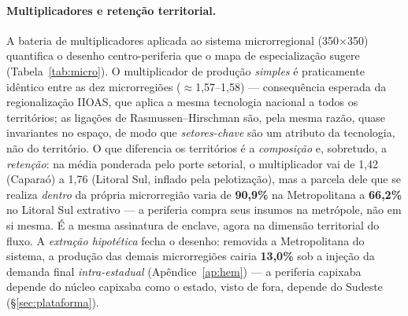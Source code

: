 \documentclass[11pt,a4paper]{article}
\begin{document}
\paragraph{Multiplicadores e retenção territorial.}
A bateria de multiplicadores aplicada ao sistema microrregional (350$\times$350)
quantifica o desenho centro-periferia que o mapa de especialização sugere
(Tabela~\ref{tab:micro}). O multiplicador de produção \emph{simples} é praticamente
idêntico entre as dez microrregiões ($\approx$1,57--1,58) --- consequência esperada da
regionalização IIOAS, que aplica a mesma tecnologia nacional a todos os territórios; as
ligações de Rasmussen--Hirschman são, pela mesma razão, quase invariantes no espaço, de
modo que \emph{setores-chave} são um atributo da tecnologia, não do território. O que
diferencia os territórios é a \emph{composição} e, sobretudo, a \emph{retenção}: na média
ponderada pelo porte setorial, o multiplicador vai de 1,42 (Caparaó) a 1,76 (Litoral Sul,
inflado pela pelotização), mas a parcela dele que se realiza \emph{dentro} da própria
microrregião varia de \textbf{90,9\%} na Metropolitana a \textbf{66,2\%} no Litoral Sul
extrativo --- a periferia compra seus insumos na metrópole, não em si mesma. É a mesma
assinatura de enclave, agora na dimensão territorial do fluxo. A \emph{extração hipotética}
\citep{dietzenbacher1993} fecha o desenho: removida a Metropolitana do sistema, a produção
das demais microrregiões cairia \textbf{13,0\%} sob a injeção da demanda final
\emph{intra-estadual} (Apêndice~\ref{ap:hem}) --- a periferia capixaba depende do núcleo
capixaba como o estado, visto de fora, depende do Sudeste (\S\ref{sec:plataforma}).
\end{document}
